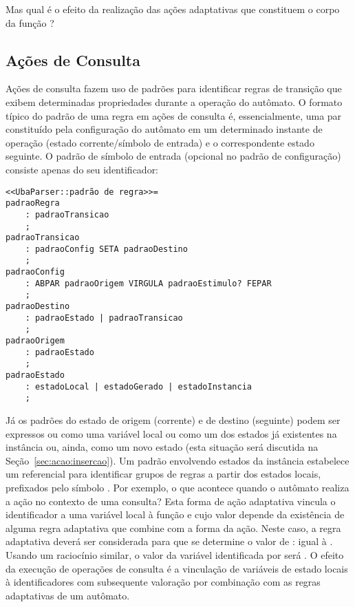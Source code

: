 Mas qual é o efeito da realização das ações adaptativas que constituem o corpo da função ?

\subsection*{Ações de Consulta}

Ações de consulta fazem uso de padrões para identificar regras de transição que exibem determinadas propriedades durante a operação do autômato. O formato típico do padrão de uma regra em ações de consulta é, essencialmente, uma par constituído pela configuração do autômato em um determinado instante de operação (estado corrente/símbolo de entrada) e o correspondente estado seguinte. O padrão de símbolo de entrada (opcional no padrão de configuração) consiste apenas do seu identificador:

\begin{lstlisting}[style=antlr]
<<UbaParser::padrão de regra>>=
padraoRegra
    : padraoTransicao
    ;
padraoTransicao
    : padraoConfig SETA padraoDestino
    ;
padraoConfig
    : ABPAR padraoOrigem VIRGULA padraoEstimulo? FEPAR
    ;
padraoDestino
    : padraoEstado | padraoTransicao
    ;
padraoOrigem
    : padraoEstado
    ;
padraoEstado
    : estadoLocal | estadoGerado | estadoInstancia
    ;
\end{lstlisting}

\noindent
Já os padrões do estado de origem (corrente) e de destino (seguinte) podem ser expressos ou como uma variável local ou como um dos estados já existentes na instância ou, ainda, como um novo estado (esta situação será discutida na Seção~\ref{sec:acao:insercao}). Um padrão envolvendo estados da instância estabelece um referencial para identificar grupos de regras a partir dos estados locais, prefixados pelo símbolo . Por exemplo, o que acontece quando o autômato  realiza a ação  no contexto de uma consulta? Esta forma de ação adaptativa vincula o identificador  a uma variável local à função e cujo valor depende da existência de alguma regra adaptativa que combine com a forma da ação. Neste caso, a regra adaptativa  deverá ser considerada para que se determine o valor de : igual à . Usando um raciocínio similar, o valor da variável identificada por  será . O efeito da execução de operações de consulta é a vinculação de variáveis de estado locais à identificadores com subsequente valoração por combinação com as regras adaptativas de um autômato.

